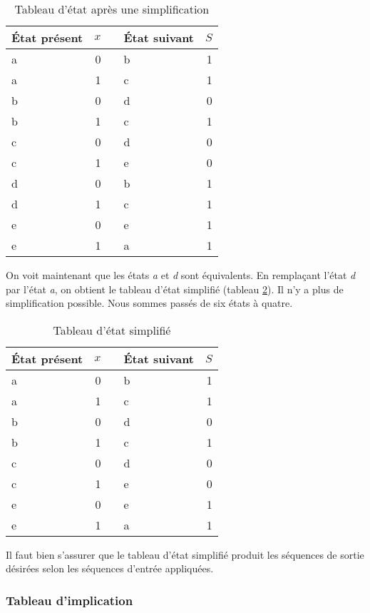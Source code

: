 \documentclass[11pt]{article}
\begin{document}
\begin{table}[htbp]
\caption{\label{tab:orga7db391}Tableau d'état après une simplification}
\centering
\begin{tabular}{lrllr}
État présent & \(x\) &  & État suivant & \(S\)\\
\hline
a & 0 &  & b & 1\\
a & 1 &  & c & 1\\
b & 0 &  & d & 0\\
b & 1 &  & c & 1\\
c & 0 &  & d & 0\\
c & 1 &  & e & 0\\
d & 0 &  & b & 1\\
d & 1 &  & c & 1\\
e & 0 &  & e & 1\\
e & 1 &  & a & 1\\
\end{tabular}
\end{table}

On voit maintenant que les états \emph{a} et \emph{d} sont équivalents. En
remplaçant l'état \emph{d} par l'état \emph{a}, on obtient le tableau d'état
simplifié (tableau \ref{tab:orgbe2aa1b}). Il n'y a plus de simplification
possible. Nous sommes passés de six états à quatre.

\begin{table}[htbp]
\caption{\label{tab:orgbe2aa1b}Tableau d'état simplifié}
\centering
\begin{tabular}{lrllr}
État présent & \(x\) &  & État suivant & \(S\)\\
\hline
a & 0 &  & b & 1\\
a & 1 &  & c & 1\\
b & 0 &  & d & 0\\
b & 1 &  & c & 1\\
c & 0 &  & d & 0\\
c & 1 &  & e & 0\\
e & 0 &  & e & 1\\
e & 1 &  & a & 1\\
\end{tabular}
\end{table}

Il faut bien s'assurer que le tableau d'état simplifié produit les
séquences de sortie désirées selon les séquences d'entrée appliquées.

\subsubsection{Tableau d'implication}
\label{sec:orgca5870c}
\end{document}
